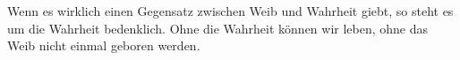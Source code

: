 Wenn es wirklich einen Gegensatz zwischen Weib und Wahrheit giebt, so steht es um die Wahrheit bedenklich. Ohne die Wahrheit können wir leben, ohne das Weib nicht einmal geboren werden.
\par

